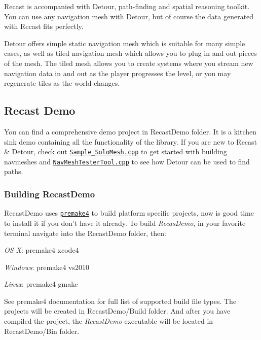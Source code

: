 Recast is accompanied with Detour, path-\/finding and spatial reasoning toolkit. You can use any navigation mesh with Detour, but of course the data generated with Recast fits perfectly.

Detour offers simple static navigation mesh which is suitable for many simple cases, as well as tiled navigation mesh which allows you to plug in and out pieces of the mesh. The tiled mesh allows you to create systems where you stream new navigation data in and out as the player progresses the level, or you may regenerate tiles as the world changes.

\subsection*{Recast Demo}

You can find a comprehensive demo project in Recast\+Demo folder. It is a kitchen sink demo containing all the functionality of the library. If you are new to Recast \& Detour, check out \href{/RecastDemo/Source/Sample_SoloMesh.cpp}{\tt Sample\+\_\+\+Solo\+Mesh.\+cpp} to get started with building navmeshes and \href{/RecastDemo/Source/NavMeshTesterTool.cpp}{\tt Nav\+Mesh\+Tester\+Tool.\+cpp} to see how Detour can be used to find paths.

\subsubsection*{Building Recast\+Demo}

Recast\+Demo uses \href{http://industriousone.com/premake}{\tt premake4} to build platform specific projects, now is good time to install it if you don't have it already. To build {\itshape Recas\+Demo}, in your favorite terminal navigate into the {\ttfamily Recast\+Demo} folder, then\+:


\begin{DoxyItemize}
\item {\itshape O\+S X}\+: {\ttfamily premake4 xcode4}
\item {\itshape Windows}\+: {\ttfamily premake4 vs2010}
\item {\itshape Linux}\+: {\ttfamily premake4 gmake}
\end{DoxyItemize}

See premake4 documentation for full list of supported build file types. The projects will be created in {\ttfamily Recast\+Demo/\+Build} folder. And after you have compiled the project, the {\itshape Recast\+Demo} executable will be located in {\ttfamily Recast\+Demo/\+Bin} folder.


